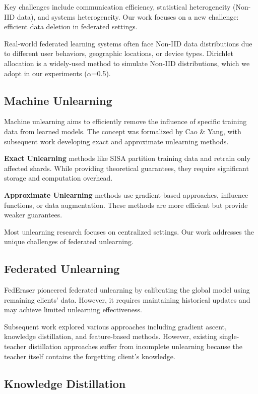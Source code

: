 \documentclass[11pt,a4paper]{article}
\begin{document}
Key challenges include communication efficiency, statistical heterogeneity (Non-IID data), and systems heterogeneity. Our work focuses on a new challenge: efficient data deletion in federated settings.

Real-world federated learning systems often face Non-IID data distributions due to different user behaviors, geographic locations, or device types. Dirichlet allocation is a widely-used method to simulate Non-IID distributions, which we adopt in our experiments ($\alpha$=0.5).

\subsection{Machine Unlearning}

Machine unlearning aims to efficiently remove the influence of specific training data from learned models. The concept was formalized by Cao \& Yang, with subsequent work developing exact and approximate unlearning methods.

\textbf{Exact Unlearning} methods like SISA partition training data and retrain only affected shards. While providing theoretical guarantees, they require significant storage and computation overhead.

\textbf{Approximate Unlearning} methods use gradient-based approaches, influence functions, or data augmentation. These methods are more efficient but provide weaker guarantees.

Most unlearning research focuses on centralized settings. Our work addresses the unique challenges of federated unlearning.

\subsection{Federated Unlearning}

FedEraser pioneered federated unlearning by calibrating the global model using remaining clients' data. However, it requires maintaining historical updates and may achieve limited unlearning effectiveness.

Subsequent work explored various approaches including gradient ascent, knowledge distillation, and feature-based methods. However, existing single-teacher distillation approaches suffer from incomplete unlearning because the teacher itself contains the forgetting client's knowledge.

\subsection{Knowledge Distillation}
\end{document}
